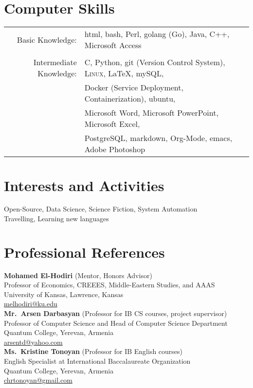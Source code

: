 \documentclass[a4paper,10pt]{article}
\begin{document}
\section{Computer Skills}
\begin{tabular}{rl}

  Basic Knowledge:& html, bash, Perl, golang (Go), Java, C++, Microsoft Access\\\\
  
  Intermediate Knowledge:& C, Python, git (Version Control System), \textsc{Linux}, \LaTeX, mySQL,\\&Docker (Service Deployment, Containerization), ubuntu,\\&
  Microsoft Word, Microsoft PowerPoint, Microsoft Excel,\\&PostgreSQL, markdown, Org-Mode, emacs, Adobe Photoshop\\
  
\end{tabular}

\section{Interests and Activities}
Open-Source, Data Science, Science Fiction, System Automation\\
Travelling, Learning new languages

\section{Professional References}

\textbf{Mohamed El-Hodiri} (Mentor, Honors Advisor)\\
Professor of Economics, CREEES, Middle-Eastern Studies, and AAAS\\
University of Kansas, Lawrence, Kansas\\
\href{mailto:melhodiri@ku.edu}{melhodiri@ku.edu}\\

\textbf{Mr.\ Arsen Darbasyan} (Professor for IB CS courses, project supervisor)\\
Professor of Computer Science and Head of Computer Science Department\\
Quantum College, Yerevan, Armenia\\
\href{mailto:arsentd@yahoo.com}{arsentd@yahoo.com}\\

\textbf{Ms.\ Kristine Tonoyan} (Professor for IB English courses)\\
English Specialist at International Baccalaureate Organization\\
Quantum College, Yerevan, Armenia\\
\href{mailto:chrtonoyan@gmail.com}{chrtonoyan@gmail.com}\\
\end{document}
